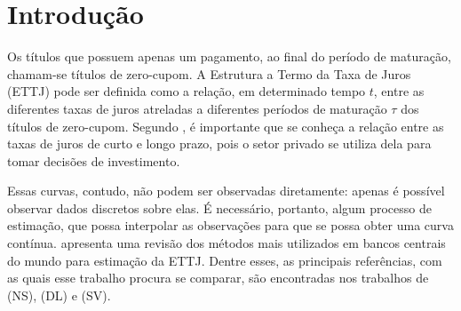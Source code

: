 \documentclass[
	12pt,				%
	openright,			%
	oneside,			%
	a4paper,			%
	english,			%
	brazil				%
	]{dissertacao-ufrgs-abntex2}
\begin{document}
\chapter*[Introdução]{Introdução}


Os títulos que possuem apenas um pagamento, ao final do período de
maturação, chamam-se títulos de zero-cupom. A Estrutura a Termo da
Taxa de Juros (ETTJ) pode ser definida como a relação, em determinado tempo $t$, entre as diferentes taxas de juros atreladas
a diferentes períodos de maturação $\tau$ dos títulos de zero-cupom.
Segundo , é importante que se conheça a relação
entre as taxas de juros de curto e longo prazo, pois o setor privado
se utiliza dela para tomar decisões de investimento.

Essas curvas, contudo, não podem ser observadas diretamente: apenas é possível observar dados discretos sobre elas. É necessário, portanto, algum
processo de estimação, que possa interpolar as observações para que
se possa obter uma curva contínua.   apresenta
uma revisão dos métodos mais utilizados em bancos centrais do mundo
para estimação da ETTJ. Dentre esses, as principais referências, com
as quais esse trabalho procura se comparar, são encontradas nos trabalhos 
de (NS), 
(DL) e (SV).
\end{document}

